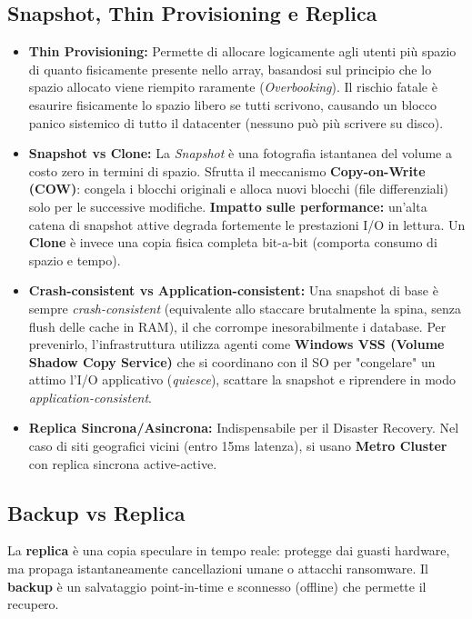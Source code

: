 \subsection{Snapshot, Thin Provisioning e Replica}
\begin{itemize}
    \item \textbf{Thin Provisioning:} Permette di allocare logicamente agli utenti più spazio di quanto fisicamente presente nello array, basandosi sul principio che lo spazio allocato viene riempito raramente (\textit{Overbooking}). Il rischio fatale è esaurire fisicamente lo spazio libero se tutti scrivono, causando un blocco panico sistemico di tutto il datacenter (nessuno può più scrivere su disco).
    \item \textbf{Snapshot vs Clone:} La \textit{Snapshot} è una fotografia istantanea del volume a costo zero in termini di spazio. Sfrutta il meccanismo \textbf{Copy-on-Write (COW)}: congela i blocchi originali e alloca nuovi blocchi (file differenziali) solo per le successive modifiche. \textbf{Impatto sulle performance:} un'alta catena di snapshot attive degrada fortemente le prestazioni I/O in lettura. Un \textbf{Clone} è invece una copia fisica completa bit-a-bit (comporta consumo di spazio e tempo).
    \item \textbf{Crash-consistent vs Application-consistent:} Una snapshot di base è sempre \textit{crash-consistent} (equivalente allo staccare brutalmente la spina, senza flush delle cache in RAM), il che corrompe inesorabilmente i database. Per prevenirlo, l'infrastruttura utilizza agenti come \textbf{Windows VSS (Volume Shadow Copy Service)} che si coordinano con il SO per "congelare" un attimo l'I/O applicativo (\textit{quiesce}), scattare la snapshot e riprendere in modo \textit{application-consistent}.
    \item \textbf{Replica Sincrona/Asincrona:} Indispensabile per il Disaster Recovery. Nel caso di siti geografici vicini (entro 15ms latenza), si usano \textbf{Metro Cluster} con replica sincrona active-active.
\end{itemize}

\subsection{Backup vs Replica}
La \textbf{replica} è una copia speculare in tempo reale: protegge dai guasti hardware, ma propaga istantaneamente cancellazioni umane o attacchi ransomware. Il \textbf{backup} è un salvataggio point-in-time e sconnesso (offline) che permette il recupero.

